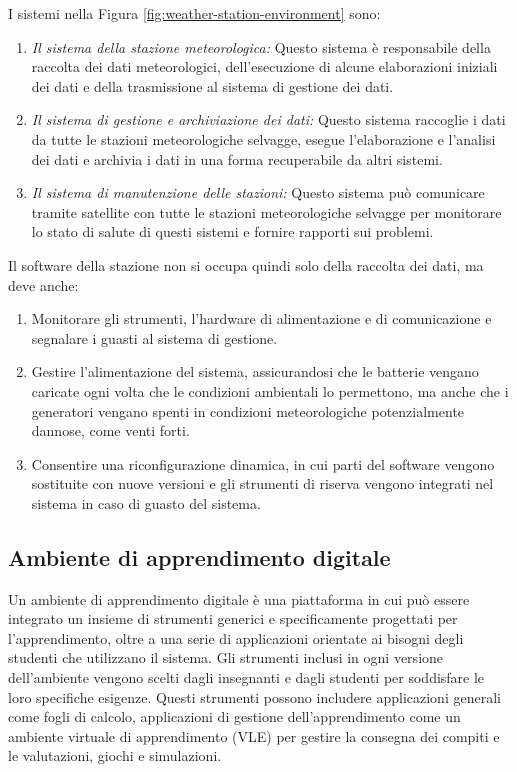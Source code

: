 I sistemi nella Figura \ref{fig:weather-station-environment} sono:
\begin{enumerate}
    \item \textit{Il sistema della stazione meteorologica:} Questo sistema è responsabile della raccolta dei dati meteorologici, dell'esecuzione di alcune elaborazioni iniziali dei dati e della trasmissione al sistema di gestione dei dati.
    \item \textit{Il sistema di gestione e archiviazione dei dati:} Questo sistema raccoglie i dati da tutte le stazioni meteorologiche selvagge, esegue l'elaborazione e l'analisi dei dati e archivia i dati in una forma recuperabile da altri sistemi.
    \item \textit{Il sistema di manutenzione delle stazioni:} Questo sistema può comunicare tramite satellite con tutte le stazioni meteorologiche selvagge per monitorare lo stato di salute di questi sistemi e fornire rapporti sui problemi.
\end{enumerate}
Il software della stazione non si occupa quindi solo della raccolta dei dati, ma deve anche:
\begin{enumerate}
    \item Monitorare gli strumenti, l'hardware di alimentazione e di comunicazione e segnalare i guasti al sistema di gestione.
    \item Gestire l'alimentazione del sistema, assicurandosi che le batterie vengano caricate ogni volta che le condizioni ambientali lo permettono, ma anche che i generatori vengano spenti in condizioni meteorologiche potenzialmente dannose, come venti forti.
    \item Consentire una riconfigurazione dinamica, in cui parti del software vengono sostituite con nuove versioni e gli strumenti di riserva vengono integrati nel sistema in caso di guasto del sistema.
\end{enumerate}

\subsection*{Ambiente di apprendimento digitale}
Un ambiente di apprendimento digitale è una piattaforma in cui può essere integrato un insieme di strumenti generici e specificamente progettati per l'apprendimento, oltre a una serie di applicazioni orientate ai bisogni degli studenti che utilizzano il sistema. Gli strumenti inclusi in ogni versione dell'ambiente vengono scelti dagli insegnanti e dagli studenti per soddisfare le loro specifiche esigenze. Questi strumenti possono includere applicazioni generali come fogli di calcolo, applicazioni di gestione dell'apprendimento come un ambiente virtuale di apprendimento (VLE) per gestire la consegna dei compiti e le valutazioni, giochi e simulazioni.

